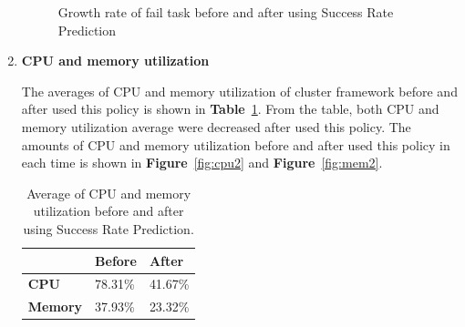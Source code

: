 \documentclass[12pt,oneside,openright,a4paper]{cpe-english-project}
\begin{document}
\begin{enumerate}
\begin{figure}[!h]\centering
    \setlength{\fboxrule}{0mm} %
    \setlength{\fboxsep}{0cm}
    \caption{Growth rate of fail task before and after using Success Rate Prediction}\label{fig:fail2}
\end{figure}

\newpage
  \item \textbf{CPU and memory utilization}

\hspace{10mm}The averages of CPU and memory utilization of cluster framework before and after used this policy is shown in \textbf{Table}~\ref{tbl:po2CPUMem}. From the table, both CPU and memory utilization average were decreased after used this policy. The amounts of CPU and memory utilization before and after used this policy in each time is shown in \textbf{Figure}~\ref{fig:cpu2} and \textbf{Figure}~\ref{fig:mem2}. 
  
  \begin{table}[!h]
  \caption{Average of CPU and memory utilization before and after using Success Rate Prediction.}\label{tbl:po2CPUMem}
  \begin{tabular}{@{}|p{}|p{}|p{}|}
   \hline
   \textbf{} & \textbf{Before} & \textbf{After} \\ 
   \hline
   \textbf{CPU} & 78.31\% & 41.67\% \\ 
   \hline
   \textbf{Memory} & 37.93\% & 23.32\% \\ 
   \hline                     
  \end{tabular}
\end{table}


\end{enumerate}
\end{document}
